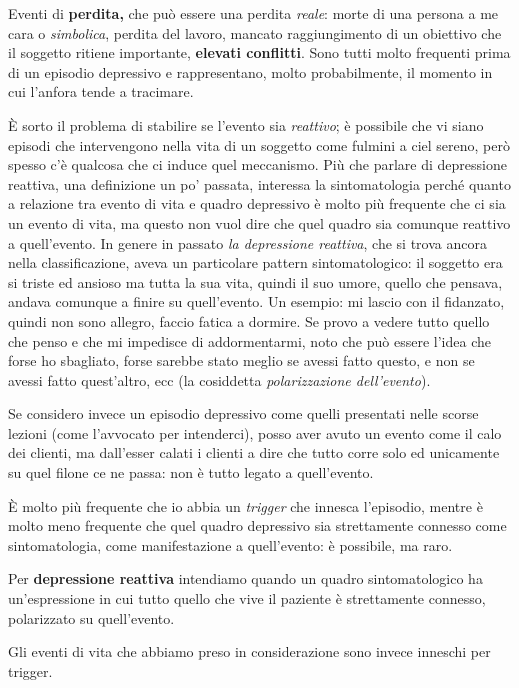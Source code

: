 Eventi di \textbf{perdita,} che può essere una perdita \emph{reale}:
morte di una persona a me cara o \emph{simbolica}, perdita del lavoro,
mancato raggiungimento di un obiettivo che il soggetto ritiene
importante, \textbf{elevati conflitti}. Sono tutti molto frequenti prima
di un episodio depressivo e rappresentano, molto probabilmente, il
momento in cui l'anfora tende a tracimare.

È sorto il problema di stabilire se l'evento sia \emph{reattivo}; è
possibile che vi siano episodi che intervengono nella vita di un
soggetto come fulmini a ciel sereno, però spesso c'è qualcosa che ci
induce quel meccanismo. Più che parlare di depressione reattiva, una
definizione un po' passata, interessa la sintomatologia perché quanto a
relazione tra evento di vita e quadro depressivo è molto più frequente
che ci sia un evento di vita, ma questo non vuol dire che quel quadro
sia comunque reattivo a quell'evento. In genere in passato \emph{la
depressione reattiva}, che si trova ancora nella classificazione, aveva
un particolare pattern sintomatologico: il soggetto era si triste ed
ansioso ma tutta la sua vita, quindi il suo umore, quello che pensava,
andava comunque a finire su quell'evento. Un esempio: mi lascio con il
fidanzato, quindi non sono allegro, faccio fatica a dormire. Se provo a
vedere tutto quello che penso e che mi impedisce di addormentarmi, noto
che può essere l'idea che forse ho sbagliato, forse sarebbe stato meglio
se avessi fatto questo, e non se avessi fatto quest'altro, ecc (la
cosiddetta \emph{polarizzazione dell'evento}).

Se considero invece un episodio depressivo come quelli presentati nelle
scorse lezioni (come l'avvocato per intenderci), posso aver avuto un
evento come il calo dei clienti, ma dall'esser calati i clienti a dire
che tutto corre solo ed unicamente su quel filone ce ne passa: non è
tutto legato a quell'evento.

È molto più frequente che io abbia un \emph{trigger} che innesca
l'episodio, mentre è molto meno frequente che quel quadro depressivo sia
strettamente connesso come sintomatologia, come manifestazione a
quell'evento: è possibile, ma raro.

Per \textbf{depressione reattiva} intendiamo quando un quadro
sintomatologico ha un'espressione in cui tutto quello che vive il
paziente è strettamente connesso, polarizzato su quell'evento.

Gli eventi di vita che abbiamo preso in considerazione sono invece
inneschi per trigger.


